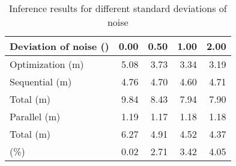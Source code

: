 \begin{table*}
  \centering
  \caption{Inference results for different standard deviations of noise}
  \ttfamily
  \begin{tabular}{lrrrr}
    \toprule
    \textnormal{Deviation of noise (\celsius{})} & 0.00 & 0.50 & 1.00 & 2.00 \\
    \midrule
    \textnormal{Optimization (m)}                & 5.08 & 3.73 & 3.34 & 3.19 \\
    \midrule
    \textnormal{Sequential (m)}                  & 4.76 & 4.70 & 4.60 & 4.71 \\
    \textnormal{Total (m)}                       & 9.84 & 8.43 & 7.94 & 7.90 \\
    \midrule
    \textnormal{Parallel (m)}                    & 1.19 & 1.17 & 1.18 & 1.18 \\
    \textnormal{Total (m)}                       & 6.27 & 4.91 & 4.52 & 4.37 \\
    \midrule
    \textnormal{\up{NRMSE} (\%)}                 & 0.02 & 2.71 & 3.42 & 4.05 \\
    \bottomrule
  \end{tabular}
\end{table*}
